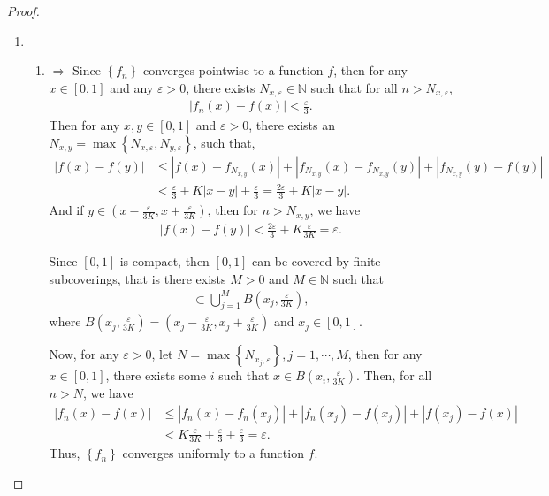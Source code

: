 \documentclass[11pt]{article}
\theoremstyle{definition}
\numberwithin{equation}{subsection}
\begin{document}
\begin{proof}
~\begin{enumerate}[label=(\alph*)]
    \item \begin{enumerate}[label=\arabic*)]
        \item $\Rightarrow$ Since $\left\{f_n\right\}$ converges pointwise to a function $f$, then for any $x \in [0,1]$ and any $\varepsilon > 0$, there exists $N_{x, \varepsilon} \in \mathbb{N}$ such that for all $n > N_{x, \varepsilon}$, 
        \begin{align*}
            \left| f_n(x) - f(x) \right| < \frac{\varepsilon}{3}.
        \end{align*}
        Then for any $x, y \in [0,1]$ and $\varepsilon > 0$, there exists an $N_{x,y} = \max \left\{N_{x, \varepsilon}, N_{y, \varepsilon}\right\}$, such that, 
        \begin{align*}
            |f(x) - f(y)| & \leq \left|f(x) - f_{N_{x,y}}(x)\right| + \left|f_{N_{x,y}}(x) - f_{N_{x,y}}(y)\right| + \left|f_{N_{x,y}}(y) - f(y)\right| \\
            & < \frac{\varepsilon}{3} + K |x - y| + \frac{\varepsilon}{3} = \frac{2 \varepsilon}{3} + K |x - y|.
        \end{align*}
        And if $y \in \left(x - \frac{\varepsilon}{3K}, x + \frac{\varepsilon}{3K} \right)$, then for $n > N_{x,y}$, we have 
        \begin{align*}
            |f(x) - f(y)| < \frac{2 \varepsilon}{3} + K \frac{\varepsilon}{3K} = \varepsilon.
        \end{align*}
    
        Since $[0,1]$ is compact, then $[0,1]$ can be covered by finite subcoverings, that is there exists $M > 0$ and $M \in \mathbb{N}$ such that
        \begin{align*}
            [0,1] \subset \bigcup^M_{j=1} B \left(x_j, \frac{\varepsilon}{3K} \right),
        \end{align*}
        where $B \left(x_j, \frac{\varepsilon}{3K}\right) = \left(x_j - \frac{\varepsilon}{3K}, x_j + \frac{\varepsilon}{3K} \right)$ and $x_j \in [0,1]$.
    
        Now, for any $\varepsilon > 0$, let $N = \max \left\{ N_{x_j, \varepsilon} \right\}, j = 1, \cdots, M$, then for any $x \in [0,1]$, there exists some $i$ such that $x \in B \left(x_i, \frac{\varepsilon}{3K}\right)$. Then, for all $n > N$, we have
        \begin{align*}
            |f_n(x) - f(x)| & \leq |f_n(x) - f_n(x_j)| + |f_n(x_j) - f(x_j)| + |f(x_j) - f(x)| \\
            & < K \frac{\varepsilon}{3K} + \frac{\varepsilon}{3} + \frac{\varepsilon}{3} = \varepsilon.
        \end{align*}
        Thus, $\left\{f_n\right\}$ converges uniformly to a function $f$.
        

\end{enumerate}
\end{enumerate}
\end{proof}
\end{document}
